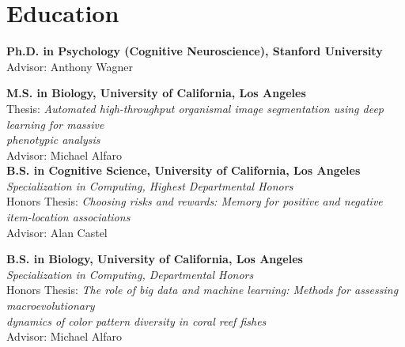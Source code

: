 \section*{Education}
\textbf{Ph.D. in Psychology (Cognitive Neuroscience), Stanford University}\\ 
Advisor: Anthony Wagner

\bigskip

\textbf{M.S. in Biology, University of California, Los Angeles}\\ 
Thesis: \textit{Automated high-throughput organismal image segmentation using deep learning for massive\\ phenotypic analysis}\\
Advisor: Michael Alfaro\\


\textbf{B.S. in Cognitive Science, University of California, Los Angeles}\\ 
\textit{Specialization in Computing, Highest Departmental Honors}\\
Honors Thesis: \textit{Choosing risks and rewards: Memory for positive and negative item-location associations}\\
Advisor: Alan Castel

\medskip\medskip

\textbf{B.S. in Biology, University of California, Los Angeles}\\ 
\textit{Specialization in Computing, Departmental Honors}\\
Honors Thesis: \textit{The role of big data and machine learning: Methods for assessing macroevolutionary\\dynamics of color pattern diversity in coral reef fishes}\\
Advisor: Michael Alfaro